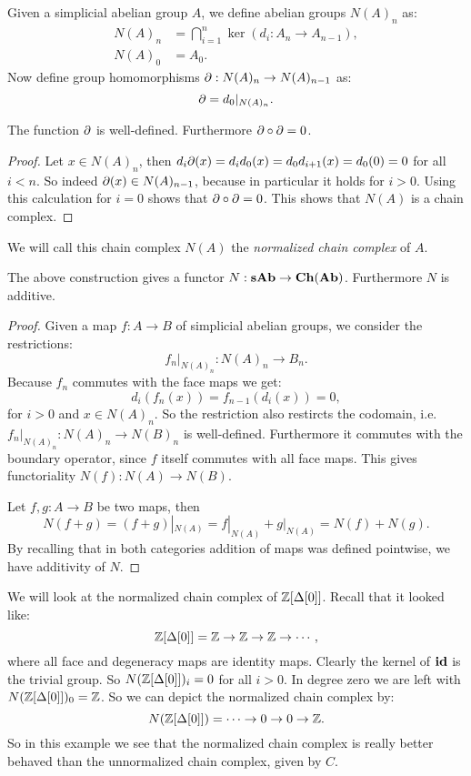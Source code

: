 Given a simplicial abelian group $A$, we define abelian groups $N(A)_n$ as:
\begin{align*}
	N(A)_n &= \bigcap_{i=1}^{n} \ker(d_i : A_n \to A_{n-1}), \\
	N(A)_0 &= A_0.
\end{align*}
Now define group homomorphisms $\partial : N(A)_n \to N(A)_{n-1}$ as:
$$ \partial = d_0|_{N(A)_n}. $$
\begin{lemma}
	The function $ \partial $ is well-defined. Furthermore $ \partial \circ \partial = 0 $.
\end{lemma}
\begin{proof}
	Let $x \in N(A)_n$, then $d_i \partial(x) = d_i d_0(x) = d_0 d_{i+1}(x) = d_0 (0) = 0$ for all $i < n$. So indeed $\partial(x) \in N(A)_{n-1}$, because in particular it holds for $i > 0$. Using this calculation for $i = 0$ shows that $\partial \circ \partial = 0$. This shows that $N(A)$ is a chain complex.
\end{proof}

We will call this chain complex $N(A)$ the \emph{normalized chain complex} of $A$.
\begin{lemma}
	The above construction gives a functor $N: \mathbf{sAb} \to \mathbf{Ch}(\mathbf{Ab})$. Furthermore $N$ is additive.
\end{lemma}
\begin{proof}
	Given a map $f: A \to B$ of simplicial abelian groups, we consider the restrictions:
	$$ f_n |_{N(A)_n} : N(A)_n \to B_n. $$
	Because $f_n$ commutes with the face maps we get:
	$$ d_i(f_n(x)) = f_{n-1}(d_i(x)) = 0, $$
	for $i>0$ and $x \in N(A)_n$. So the restriction also restircts the codomain, i.e. $f_n |_{N(A)_n} : N(A)_n \to N(B)_n$ is well-defined. Furthermore it commutes with the boundary operator, since $f$ itself commutes with all face maps. This gives functoriality $N(f): N(A) \to N(B)$.

	Let $f, g: A \to B$ be two maps, then
	$$ N(f+g) = (f+g)|_{N(A)} = f|_{N(A)} + g|_{N(A)} = N(f) + N(g). $$
	By recalling that in both categories addition of maps was defined pointwise, we have additivity of $N$.
\end{proof}

\begin{example}
	We will look at the normalized chain complex of $\mathbb{Z}[\Delta[0]]$. Recall that it looked like:
	$$ \mathbb{Z}[\Delta[0]] = \mathbb{Z} \to \mathbb{Z} \to \mathbb{Z} \to \cdots, $$
	where all face and degeneracy maps are identity maps. Clearly the kernel of $\mathbf{id}$ is the trivial group. So $N(\mathbb{Z}[\Delta[0]])_i = 0$ for all $i > 0$. In degree zero we are left with $N(\mathbb{Z}[\Delta[0]])_0 = \mathbb{Z}$. So we can depict the normalized chain complex by:
	$$ N(\mathbb{Z}[\Delta[0]]) = \cdots \to 0 \to 0 \to \mathbb{Z}. $$
	So in this example we see that the normalized chain complex is really better behaved than the unnormalized chain complex, given by $C$.
\end{example}

